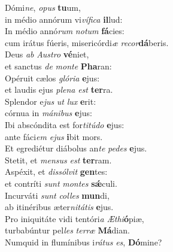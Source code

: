 \evenverse Dómi\textit{ne}, \textit{o}\textit{pus} \textbf{tu}um,~\*\\
\evenverse in médio annórum vi\textit{ví}\textit{fi}\textit{ca} \textbf{il}lud:\\
\oddverse In médio annó\textit{rum} \textit{no}\textit{tum} \textbf{fá}cies:~\*\\
\oddverse cum irátus fúeris, misericórdi\textit{æ} \textit{re}\textit{cor}\textbf{dá}beris.\\
\evenverse Deus \textit{ab} \textit{Au}\textit{stro} \textbf{vé}niet,~\*\\
\evenverse et sanctus \textit{de} \textit{mon}\textit{te} \textbf{Pha}ran:\\
\oddverse Opéruit cælos \textit{gló}\textit{ri}\textit{a} \textbf{e}jus:~\*\\
\oddverse et laudis ejus \textit{ple}\textit{na} \textit{est} \textbf{ter}ra.\\
\evenverse Splendor e\textit{jus} \textit{ut} \textit{lux} \textbf{e}rit:~\*\\
\evenverse córnua in \textit{má}\textit{ni}\textit{bus} \textbf{e}jus:\\
\oddverse Ibi abscóndita est for\textit{ti}\textit{tú}\textit{do} \textbf{e}jus:~\*\\
\oddverse ante fáci\textit{em} \textit{e}\textit{jus} \textbf{i}bit mors.\\
\evenverse Et egrediétur diábolus an\textit{te} \textit{pe}\textit{des} \textbf{e}jus.~\*\\
\evenverse Stetit, et \textit{men}\textit{sus} \textit{est} \textbf{ter}ram.\\
\oddverse Aspéxit, et \textit{dis}\textit{sól}\textit{vit} \textbf{gen}tes:~\*\\
\oddverse et contríti \textit{sunt} \textit{mon}\textit{tes} \textbf{sǽ}culi.\\
\evenverse Incurváti \textit{sunt} \textit{col}\textit{les} \textbf{mun}di,~\*\\
\evenverse ab itinéribus æter\textit{ni}\textit{tá}\textit{tis} \textbf{e}jus.\\
\oddverse Pro iniquitáte vidi tentóri\textit{a} \textit{Æ}\textit{thi}\textbf{ó}piæ,~\*\\
\oddverse turbabúntur pel\textit{les} \textit{ter}\textit{ræ} \textbf{Má}dian.\\
\evenverse Numquid in flumínibus i\textit{rá}\textit{tus} \textit{es}, \textbf{Dó}mine?~\*\\
